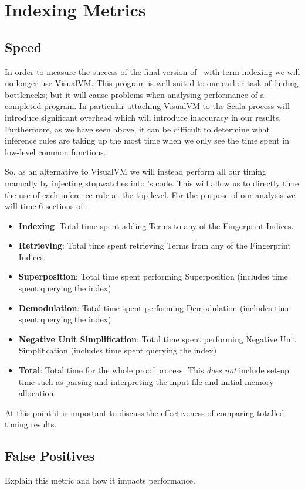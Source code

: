 \section{Indexing Metrics}
\label{sec:metrics}

\subsection{Speed}
In order to measure the success of the final version of \beagle\ with term indexing
we will no longer use VisualVM. This program is well suited to our earlier task
of finding bottlenecks; but it will cause problems when analysing performance of a completed program.
In particular attaching VisualVM to the Scala process will introduce significant overhead
which will introduce inaccuracy in our results. Furthermore, as we have seen above,
it can be difficult to determine what inference rules are taking up the most time
when we only see the time spent in low-level common functions.

So, as an alternative to VisualVM we will instead perform all our timing manually
by injecting stopwatches into \beagle's code. This will allow us to directly
time the use of each inference rule at the top level. For the purpose of our analysis
we will time 6 sections of \beagle:
\begin{itemize}
\item \textbf{Indexing}: Total time spent adding Terms to any of the Fingerprint Indices.
\item \textbf{Retrieving}: Total time spent retrieving Terms from any of the Fingerprint Indices.
\item \textbf{Superposition}: Total time spent performing Superposition (includes time spent
querying the index)
\item \textbf{Demodulation}: Total time spent performing Demodulation (includes time spent
querying the index)
\item \textbf{Negative Unit Simplification}: Total time spent performing Negative Unit Simplification (includes time spent
querying the index)
\item \textbf{Total}: Total time for the whole proof process. This \emph{does not} include
set-up time such as parsing and interpreting the input file and initial memory allocation.
\end{itemize}
At this point it is important to discuss the effectiveness of comparing totalled timing
results. 

\subsection{False Positives}
Explain this metric and how it impacts performance.

